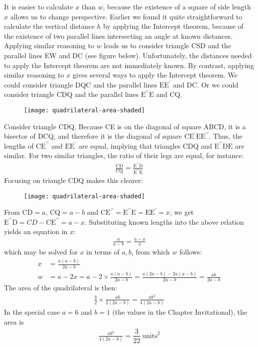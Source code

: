 It is easier to calculate $x$ than $w$, because the existence of a square of side length $x$ allows us to change perspective. Earlier we found it quite straightforward to calculate the vertical distance $h$ by applying the Intercept theorem, because of the existence of two parallel lines intersecting an angle at known distances. Applying similar reasoning to $w$ leads us to consider triangle CSD and the parallel lines EW and DC (see figure below). Unfortunately, the distances needed to apply the Intercept theorem are not immediately known. By contrast, applying similar reasoning to $x$ gives several ways to apply the Intercept theorem. We could consider triangle DQC and the parallel lines $\text{E}\text{E}^{\prime}$ and DC. Or we could consider triangle CDQ and the parallel lines $\text{E}^{\prime\prime}\text{E}$ and CQ. 

\begin{figure}[H]
\centering
\texttt{[image: quadrilateral-area-shaded]}
\end{figure} 

Consider triangle CDQ. Because CE is on the diagonal of square ABCD, it is a bisector of DCQ, and therefore it is the diagonal of square $\text{C}\text{E}^{\prime}\text{E}\text{E}^{\prime\prime}$. Thus, the lengths of $\text{C}\text{E}^{\prime\prime}$ and $\text{E}\text{E}^{\prime}$ are equal, implying that triangles CDQ and  $\text{E}^{\prime\prime}\text{D}\text{E}$ are similar. For two similar triangles, the ratio of their legs are equal, for instance:
\begin{align*}
\frac{\text{C}\text{D}}{\text{C}\text{Q}} 
= \frac{\text{E}^{\prime\prime}\text{D}}{\text{E}^{\prime\prime}\text{E}}  
\end{align*}
Focusing on triangle CDQ makes this clearer:
\begin{figure}[H]
\centering
\texttt{[image: quadrilateral-area-shaded]}
\end{figure}
From $\text{CD}=a$, $\text{CQ}=a-b$ and   $\text{C}\text{E}^{\prime\prime}=\text{E}^{\prime\prime}\text{E}=\text{E}\text{E}^{\prime}=x$, we get $\text{E}^{\prime\prime}\text{D}=CD-\text{C}\text{E}^{\prime\prime}=a-x$. Substituting known lengths into the above relation yields an equation in $x$:
\begin{align*}
\frac{a}{a-b} = \frac{a-x}{x} 
\end{align*}
which may be solved for $x$ in terms of $a,b$, from which $w$ follows: 
\begin{align*}
x & = \frac{a(a-b)}{2a-b} \\
w & = a - 2x 
    = a - 2 \times \frac{a(a-b)}{2a-b} 
    = \frac{a(2a-b)-2a(a-b)}{2a-b}
    = \frac{ab}{2a-b}
\end{align*}
The area of the quadrilateral is then:
\begin{align*}
\frac{b}{2} \times \frac{ab}{2(2a-b)}
  = \frac{ab^2}{4(2a-b)}
\end{align*}
In the special case $a=6$ and $b=1$ (the values in the Chapter Invitational), the area is
\begin{align*}
\frac{ab^2}{4(2a-b)}
 = \dfrac{3}{22}~\text{units}^{2}
\end{align*}

